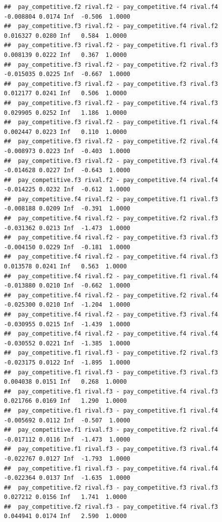 \documentclass[
]{article}
\begin{document}
\begin{verbatim}
##  pay_competitive.f2 rival.f2 - pay_competitive.f4 rival.f4 -0.008804 0.0174 Inf  -0.506  1.0000
##  pay_competitive.f3 rival.f2 - pay_competitive.f4 rival.f2  0.016327 0.0280 Inf   0.584  1.0000
##  pay_competitive.f3 rival.f2 - pay_competitive.f1 rival.f3  0.008139 0.0222 Inf   0.367  1.0000
##  pay_competitive.f3 rival.f2 - pay_competitive.f2 rival.f3 -0.015035 0.0225 Inf  -0.667  1.0000
##  pay_competitive.f3 rival.f2 - pay_competitive.f3 rival.f3  0.012177 0.0241 Inf   0.506  1.0000
##  pay_competitive.f3 rival.f2 - pay_competitive.f4 rival.f3  0.029905 0.0252 Inf   1.186  1.0000
##  pay_competitive.f3 rival.f2 - pay_competitive.f1 rival.f4  0.002447 0.0223 Inf   0.110  1.0000
##  pay_competitive.f3 rival.f2 - pay_competitive.f2 rival.f4 -0.008973 0.0223 Inf  -0.403  1.0000
##  pay_competitive.f3 rival.f2 - pay_competitive.f3 rival.f4 -0.014628 0.0227 Inf  -0.643  1.0000
##  pay_competitive.f3 rival.f2 - pay_competitive.f4 rival.f4 -0.014225 0.0232 Inf  -0.612  1.0000
##  pay_competitive.f4 rival.f2 - pay_competitive.f1 rival.f3 -0.008188 0.0209 Inf  -0.391  1.0000
##  pay_competitive.f4 rival.f2 - pay_competitive.f2 rival.f3 -0.031362 0.0213 Inf  -1.473  1.0000
##  pay_competitive.f4 rival.f2 - pay_competitive.f3 rival.f3 -0.004150 0.0229 Inf  -0.181  1.0000
##  pay_competitive.f4 rival.f2 - pay_competitive.f4 rival.f3  0.013578 0.0241 Inf   0.563  1.0000
##  pay_competitive.f4 rival.f2 - pay_competitive.f1 rival.f4 -0.013880 0.0210 Inf  -0.662  1.0000
##  pay_competitive.f4 rival.f2 - pay_competitive.f2 rival.f4 -0.025300 0.0210 Inf  -1.204  1.0000
##  pay_competitive.f4 rival.f2 - pay_competitive.f3 rival.f4 -0.030955 0.0215 Inf  -1.439  1.0000
##  pay_competitive.f4 rival.f2 - pay_competitive.f4 rival.f4 -0.030552 0.0221 Inf  -1.385  1.0000
##  pay_competitive.f1 rival.f3 - pay_competitive.f2 rival.f3 -0.023175 0.0122 Inf  -1.895  1.0000
##  pay_competitive.f1 rival.f3 - pay_competitive.f3 rival.f3  0.004038 0.0151 Inf   0.268  1.0000
##  pay_competitive.f1 rival.f3 - pay_competitive.f4 rival.f3  0.021766 0.0169 Inf   1.290  1.0000
##  pay_competitive.f1 rival.f3 - pay_competitive.f1 rival.f4 -0.005692 0.0112 Inf  -0.507  1.0000
##  pay_competitive.f1 rival.f3 - pay_competitive.f2 rival.f4 -0.017112 0.0116 Inf  -1.473  1.0000
##  pay_competitive.f1 rival.f3 - pay_competitive.f3 rival.f4 -0.022767 0.0127 Inf  -1.793  1.0000
##  pay_competitive.f1 rival.f3 - pay_competitive.f4 rival.f4 -0.022364 0.0137 Inf  -1.635  1.0000
##  pay_competitive.f2 rival.f3 - pay_competitive.f3 rival.f3  0.027212 0.0156 Inf   1.741  1.0000
##  pay_competitive.f2 rival.f3 - pay_competitive.f4 rival.f3  0.044941 0.0174 Inf   2.590  1.0000

\end{verbatim}
\end{document}
